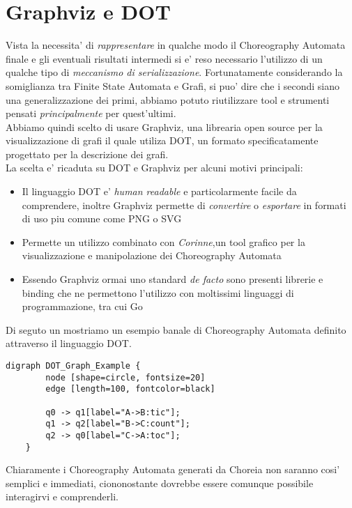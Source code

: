 \section{Graphviz e DOT}
Vista la necessita' di \emph{rappresentare} in qualche modo il Choreography Automata finale e gli eventuali risultati intermedi si e' reso necessario l'utilizzo di un qualche tipo di \emph{meccanismo di serializzazione}. Fortunatamente considerando la somiglianza tra Finite State Automata e Grafi, si puo' dire che i secondi siano una generalizzazione dei primi, abbiamo potuto riutilizzare tool e strumenti pensati \emph{principalmente} per quest'ultimi.\\
Abbiamo quindi scelto di usare Graphviz\cite{Graphviz_Wikipedia}, una librearia open source per la visualizzazione di grafi il quale utiliza DOT\cite{DOT_Wikipedia}, un formato specificatamente progettato per la descrizione dei grafi.\\
La scelta e' ricaduta su DOT e Graphviz per alcuni motivi principali:
\begin{itemize}
    \item Il linguaggio DOT e' \emph{human readable} e particolarmente facile da comprendere, inoltre Graphviz permette di \emph{convertire} o \emph{esportare} in formati di uso piu comune come PNG o SVG
    \item Permette un utilizzo combinato con \emph{Corinne}\cite{Corinne},un tool grafico per la visualizzazione e manipolazione dei Choreography Automata
    \item Essendo Graphviz ormai uno standard \emph{de facto} sono presenti librerie e binding che ne permettono l'utilizzo con moltissimi linguaggi di programmazione, tra cui Go
\end{itemize}
Di seguto un mostriamo un esempio banale di Choreography Automata definito attraverso il linguaggio DOT.
\begin{lstlisting}[caption=Rappresentazione in DOT dell'automa in figura \ref{fig:ChoreographyAutomata_Example}]
    digraph DOT_Graph_Example {
        node [shape=circle, fontsize=20]
        edge [length=100, fontcolor=black]
      
        q0 -> q1[label="A->B:tic"];
        q1 -> q2[label="B->C:count"];
        q2 -> q0[label="C->A:toc"];
    }
\end{lstlisting}
Chiaramente i Choreography Automata generati da Choreia non saranno cosi' semplici e immediati, ciononostante dovrebbe essere comunque possibile interagirvi e comprenderli.